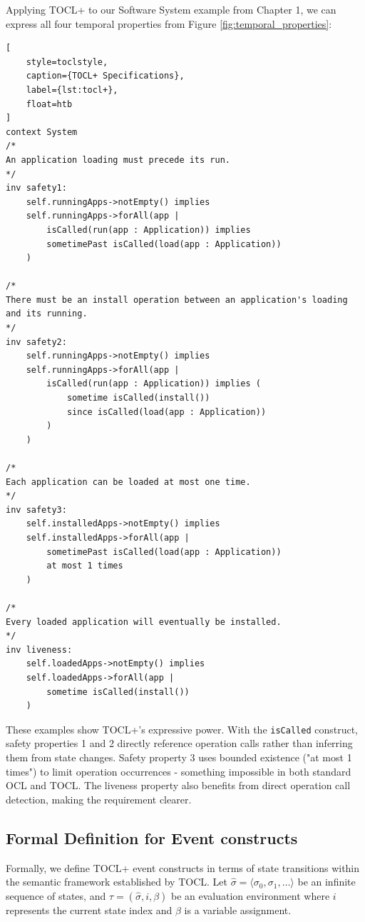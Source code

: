 Applying TOCL+ to our Software System example from Chapter 1, we can express all 
four temporal properties from Figure \ref{fig:temporal_properties}:
\begin{lstlisting}[
    style=toclstyle, 
    caption={TOCL+ Specifications}, 
    label={lst:tocl+},
    float=htb
]
context System
/*
An application loading must precede its run.
*/
inv safety1: 
    self.runningApps->notEmpty() implies
    self.runningApps->forAll(app |
        isCalled(run(app : Application)) implies
        sometimePast isCalled(load(app : Application))
    )

/*
There must be an install operation between an application's loading and its running.
*/
inv safety2: 
    self.runningApps->notEmpty() implies
    self.runningApps->forAll(app |
        isCalled(run(app : Application)) implies (
            sometime isCalled(install())
            since isCalled(load(app : Application))
        )
    )

/*
Each application can be loaded at most one time.
*/
inv safety3:
    self.installedApps->notEmpty() implies
    self.installedApps->forAll(app |
        sometimePast isCalled(load(app : Application))
        at most 1 times
    )

/*
Every loaded application will eventually be installed.
*/
inv liveness:
    self.loadedApps->notEmpty() implies
    self.loadedApps->forAll(app | 
        sometime isCalled(install())
    )
\end{lstlisting}

These examples show TOCL+'s expressive power. With the \texttt{isCalled} construct, 
safety properties 1 and 2 directly reference operation calls rather than inferring 
them from state changes. Safety property 3 uses bounded existence ("at most 1 times") 
to limit operation occurrences - something impossible in both standard OCL and TOCL. 
The liveness property also benefits from direct operation call detection, making 
the requirement clearer.


\subsection{Formal Definition for Event constructs}

\hspace{1cm} Formally, we define TOCL+ event constructs in terms of state transitions 
within the semantic framework established by TOCL. Let 
$\hat{\sigma} = \langle \sigma_0, \sigma_1, \ldots \rangle$ 
be an infinite sequence of states, and 
$\tau = (\hat{\sigma}, i, \beta)$ 
be an evaluation environment where $i$ represents the current state index and $\beta$ 
is a variable assignment.

